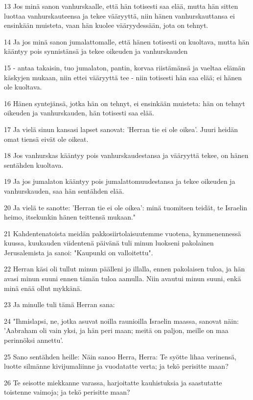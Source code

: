 \par 13 Jos minä sanon vanhurskaalle, että hän totisesti saa elää, mutta hän sitten luottaa vanhurskauteensa ja tekee vääryyttä, niin hänen vanhurskauttansa ei ensinkään muisteta, vaan hän kuolee vääryydessään, jota on tehnyt.
\par 14 Ja jos minä sanon jumalattomalle, että hänen totisesti on kuoltava, mutta hän kääntyy pois synnistänsä ja tekee oikeuden ja vanhurskauden
\par 15 - antaa takaisin, tuo jumalaton, pantin, korvaa riistämänsä ja vaeltaa elämän käskyjen mukaan, niin ettei vääryyttä tee - niin totisesti hän saa elää; ei hänen ole kuoltava.
\par 16 Hänen syntejänsä, jotka hän on tehnyt, ei ensinkään muisteta: hän on tehnyt oikeuden ja vanhurskauden, hän totisesti saa elää.
\par 17 Ja vielä sinun kansasi lapset sanovat: 'Herran tie ei ole oikea'. Juuri heidän omat tiensä eivät ole oikeat.
\par 18 Jos vanhurskas kääntyy pois vanhurskaudestansa ja vääryyttä tekee, on hänen sentähden kuoltava.
\par 19 Ja jos jumalaton kääntyy pois jumalattomuudestansa ja tekee oikeuden ja vanhurskauden, saa hän sentähden elää.
\par 20 Ja vielä te sanotte: 'Herran tie ei ole oikea': minä tuomitsen teidät, te Israelin heimo, itsekunkin hänen teittensä mukaan."
\par 21 Kahdentenatoista meidän pakkosiirtolaisuutemme vuotena, kymmenennessä kuussa, kuukauden viidentenä päivänä tuli minun luokseni pakolainen Jerusalemista ja sanoi: "Kaupunki on valloitettu".
\par 22 Herran käsi oli tullut minun päälleni jo illalla, ennen pakolaisen tuloa, ja hän avasi minun suuni ennen tämän tuloa aamulla. Niin avautui minun suuni, enkä minä enää ollut mykkänä.
\par 23 Ja minulle tuli tämä Herran sana:
\par 24 "Ihmislapsi, ne, jotka asuvat noilla raunioilla Israelin maassa, sanovat näin: 'Aabraham oli vain yksi, ja hän peri maan; meitä on paljon, meille on maa perinnöksi annettu'.
\par 25 Sano sentähden heille: Näin sanoo Herra, Herra: Te syötte lihaa verinensä, luotte silmänne kivijumaliinne ja vuodatatte verta; ja tekö perisitte maan?
\par 26 Te seisotte miekkanne varassa, harjoitatte kauhistuksia ja saastutatte toistenne vaimoja; ja tekö perisitte maan?
